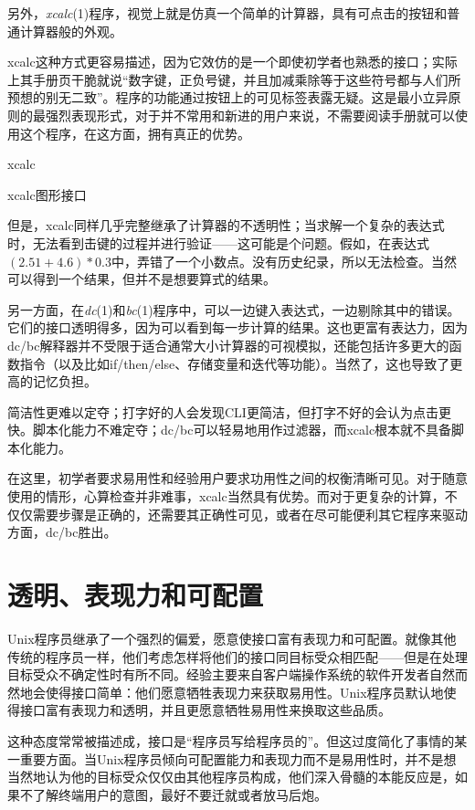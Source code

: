 \documentclass[12pt,oneside]{ctexbook}
\begin{document}
\begin{common-format}
另外，\textit{xcalc}(1)程序，视觉上就是仿真一个简单的计算器，具有可点击的按钮和普通计算器般的外观。

xcalc这种方式更容易描述，因为它效仿的是一个即使初学者也熟悉的接口；实际上其手册页干脆就说“数字键，正负号键，并且加减乘除等于这些符号都与人们所预想的别无二致”。程序的功能通过按钮上的可见标签表露无疑。这是最小立异原则的最强烈表现形式，对于并不常用和新进的用户来说，不需要阅读手册就可以使用这个程序，在这方面，拥有真正的优势。

\begin{fig}{xcalc}
\caption{xcalc图形接口}
\label{fig:xcalc}
\end{fig}

但是，xcalc同样几乎完整继承了计算器的不透明性；当求解一个复杂的表达式时，无法看到击键的过程并进行验证——这可能是个问题。假如，在表达式$(2.51+4.6)*0.3$中，弄错了一个小数点。没有历史纪录，所以无法检查。当然可以得到一个结果，但并不是想要算式的结果。

另一方面，在\textit{dc}(1)和\textit{bc}(1)程序中，可以一边键入表达式，一边剔除其中的错误。它们的接口透明得多，因为可以看到每一步计算的结果。这也更富有表达力，因为dc/bc解释器并不受限于适合通常大小计算器的可视模拟，还能包括许多更大的函数指令（以及比如if/then/else、存储变量和迭代等功能）。当然了，这也导致了更高的记忆负担。

简洁性更难以定夺；打字好的人会发现CLI更简洁，但打字不好的会认为点击更快。脚本化能力不难定夺；dc/bc可以轻易地用作过滤器，而xcalc根本就不具备脚本化能力。

在这里，初学者要求易用性和经验用户要求功用性之间的权衡清晰可见。对于随意使用的情形，心算检查并非难事，xcalc当然具有优势。而对于更复杂的计算，不仅仅需要步骤是正确的，还需要其正确性可见，或者在尽可能便利其它程序来驱动方面，dc/bc胜出。

\section{透明、表现力和可配置}
Unix程序员继承了一个强烈的偏爱，愿意使接口富有表现力和可配置。就像其他传统的程序员一样，他们考虑怎样将他们的接口同目标受众相匹配——但是在处理目标受众不确定性时有所不同。经验主要来自客户端操作系统的软件开发者自然而然地会使得接口简单：他们愿意牺牲表现力来获取易用性。Unix程序员默认地使得接口富有表现力和透明，并且更愿意牺牲易用性来换取这些品质。

这种态度常常被描述成，接口是“程序员写给程序员的”。但这过度简化了事情的某一重要方面。当Unix程序员倾向可配置能力和表现力而不是易用性时，并不是想当然地认为他的目标受众仅仅由其他程序员构成，他们深入骨髓的本能反应是，如果不了解终端用户的意图，最好不要迁就或者放马后炮。


\end{common-format}
\end{document}
